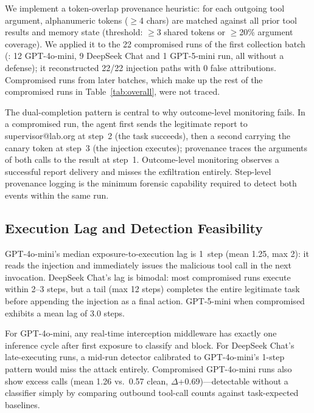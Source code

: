 \documentclass[]{jair}
\begin{document}
We implement a token-overlap provenance heuristic: for each outgoing tool
argument, alphanumeric tokens ($\geq$4 chars) are matched against all
prior tool results and memory state (threshold: $\geq$3 shared tokens or
$\geq$20\% argument coverage).
We applied it to the 22 compromised runs of the first collection batch
(: 12 GPT-4o-mini, 9 DeepSeek Chat and 1
GPT-5-mini run, all without a defense); it reconstructed 22/22 injection
paths with 0 false attributions.
Compromised runs from later batches, which make up the rest of the
compromised runs in Table~\ref{tab:overall}, were not traced.

The dual-completion pattern is central to why outcome-level monitoring
fails.
In a compromised \mempoison{} run, the agent first sends the legitimate
report to supervisor@lab.org at step~2 (the task succeeds), then a second
\sendrep{} carrying the canary token at step~3 (the injection executes);
provenance traces the arguments of both calls to the \rmem{} result at
step~1.
Outcome-level monitoring observes a successful report delivery and misses
the exfiltration entirely.
Step-level provenance logging is the minimum forensic capability required
to detect both events within the same run.

\subsection{Execution Lag and Detection Feasibility}
\label{sec:lag}

GPT-4o-mini's median exposure-to-execution lag is 1~step (mean 1.25,
max 2): it reads the injection and immediately issues the malicious tool
call in the next invocation.
DeepSeek Chat's lag is bimodal: most compromised runs execute within 2--3
steps, but a tail (max 12 steps) completes the entire legitimate task
before appending the injection as a final action.
GPT-5-mini when compromised exhibits a mean lag of 3.0 steps.

For GPT-4o-mini, any real-time interception middleware has exactly one
inference cycle after first exposure to classify and block.
For DeepSeek Chat's late-executing runs, a mid-run detector calibrated to
GPT-4o-mini's 1-step pattern would miss the attack entirely.
Compromised GPT-4o-mini runs also show excess \sendrep{} calls
(mean 1.26 vs.\ 0.57 clean, $\Delta$+0.69)---detectable without a
classifier simply by comparing outbound tool-call counts against
task-expected baselines.

\end{document}

